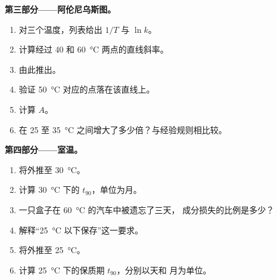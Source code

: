 \begin{problem}
\medskip
\noindent\textbf{第三部分——阿伦尼乌斯图。}
\begin{enumerate}[resume]
  \item 对三个温度，列表给出 $1/T$ 与 $\ln k$。
  \item 计算经过 40 和
        \qty{60}{\celsius} 两点的直线斜率。
  \item 由此推出。
  \item 验证 \qty{50}{\celsius} 对应的点落在该直线上。
  \item 计算 $A$。
  \item {}在 25 至
        \qty{35}{\celsius} 之间增大了多少倍？与经验规则相比较。
\end{enumerate}

\medskip
\noindent\textbf{第四部分——室温。}
\begin{enumerate}[resume]
  \item 将外推至 \qty{30}{\celsius}。
  \item 计算 \qty{30}{\celsius} 下的 $t_{90}$，单位为月。
  \item 一只盒子在 \qty{60}{\celsius} 的汽车中被遗忘了三天，
        成分损失的比例是多少？
  \item 解释“\qty{25}{\celsius} 以下保存”这一要求。
  \item 将外推至 \qty{25}{\celsius}。
  \item 计算 \qty{25}{\celsius} 下的保质期 $t_{90}$，分别以天和
        月为单位。
\end{enumerate}
\end{problem}
